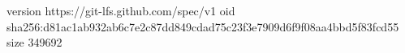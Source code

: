 version https://git-lfs.github.com/spec/v1
oid sha256:d81ac1ab932ab6c7e2c87dd849cdad75c23f3e7909d6f9f08aa4bbd5f83fcd55
size 349692
